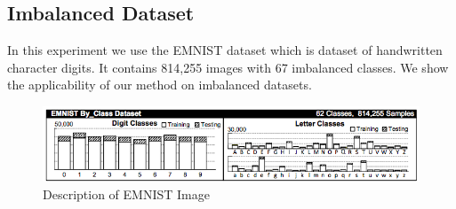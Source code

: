 \documentclass[a4paper,twoside]{iiththesis}
\theoremstyle{definition}
\theoremstyle{definition}
\theoremstyle{remark}
\begin{document}
\subsection{Imbalanced Dataset}
In this experiment we use the EMNIST dataset which is dataset of handwritten character digits. It contains 814,255 images with 67 imbalanced classes. We show the applicability of our method on imbalanced datasets.
\begin{figure}[H]
\centering
\includegraphics[width=\textwidth]{images/emnist.png}
\caption{Description of EMNIST Image}
\end{figure}
\end{document}
